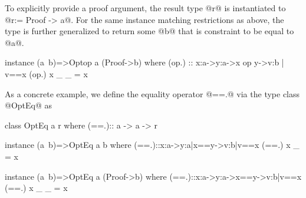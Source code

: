 \begin{comment}
Explanation of (a~b) requirement

Function `foo` has the signature:

  foo :: Foo a r => a -> r

During type inference, the term `foo _5 True` gives rise to the wanted constraint:

WC = Foo Int (Bool -> b)
and the term has type: (foo _5 True) :: b

The top-level instance gives you the bidirectional CHR (simplification rule, if you
want to learn more about this check out "Understanding Functional Dependencies via
Constraint Handling Rules"):

  CHR: (a ~ b) <==> Foo a (Bool -> b)

Now, using the rule, you can replace your wanted constraint with (Int ~ b). This you
can now discharge by instantiating `b' to `Bool'. You may feel that instantiating `b'
is "random" but it is not. At this point is like HM, where you generate equality
constraints and search for a valid solution, and both `a' and `b' are universally
quantified.

The fact that the instance was picked is also not random: Your original instance head
imposes a non-structural restriction (non-linear pattern), so it is too restrictive,
but at the same time disallows you to give another similar instance to cover the
remaining similar cases (Foo a (Bool -> b) which would match the rest of the cases
where the `a's are not the same is no longer allowed, since they would overlap. Note
that GHC allows them both --even without OverlappingInstances enabled-- but this is
a bug #11605 :P). By being too restrictive, it cannot be picked (a and b have to be
checked for equality when matching, and during inference, this information is not there.
That is why the `bar' with signature `Int -> Bool' did not have this problem, indirectly
it fixes `b' to `Int' --and `a' is already `Int'-- so it can match).

  Foo a (Bool -> a) -- Your original instance head
  Foo a (Bool -> b) -- The updated instance head

Instead, your new instance head is the most general, and it matches ANYWAY, even without
knowing `b'.
\end{comment}
%
To explicitly provide a proof argument,
the result type @r@ is instantiated to @r:= Proof -> a@.
%
For the same instance matching restrictions as above,
the type is further generalized to return some @b@
that is constraint to be equal to @a@.
%
\begin{code}
  instance (a~b)=>Optop a (Proof->b) where
  (op.) :: x:a->y:a->{x op y}->{v:b | v==x }
  (op.) x _ _ = x
\end{code}
%
As a concrete example, we define the equality operator @==.@
via the type class @OptEq@ as
\begin{code}
  class OptEq a r where
   (==.):: a -> a -> r

  instance (a~b)=>OptEq a b where
   (==.)::x:a->y:{a|x==y}->{v:b|v==x}
   (==.) x _ = x

  instance (a~b)=>OptEq a (Proof->b) where
   (==.)::x:a->y:a->{x==y}->{v:b|v==x}
   (==.) x _ _ = x
\end{code}

